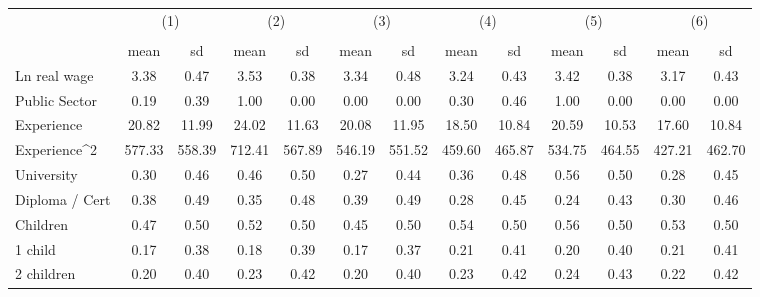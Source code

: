 {
\def\sym#1{\ifmmode^{#1}\else\(^{#1}\)\fi}
\begin{tabular}{l*{6}{cc}}
\hline\hline
                    &\multicolumn{2}{c}{(1)}  &\multicolumn{2}{c}{(2)}  &\multicolumn{2}{c}{(3)}  &\multicolumn{2}{c}{(4)}  &\multicolumn{2}{c}{(5)}  &\multicolumn{2}{c}{(6)}  \\
                    &\multicolumn{2}{c}{}     &\multicolumn{2}{c}{}     &\multicolumn{2}{c}{}     &\multicolumn{2}{c}{}     &\multicolumn{2}{c}{}     &\multicolumn{2}{c}{}     \\
                    &        mean&          sd&        mean&          sd&        mean&          sd&        mean&          sd&        mean&          sd&        mean&          sd\\
\hline
Ln real wage        &        3.38&        0.47&        3.53&        0.38&        3.34&        0.48&        3.24&        0.43&        3.42&        0.38&        3.17&        0.43\\
Public Sector       &        0.19&        0.39&        1.00&        0.00&        0.00&        0.00&        0.30&        0.46&        1.00&        0.00&        0.00&        0.00\\
Experience          &       20.82&       11.99&       24.02&       11.63&       20.08&       11.95&       18.50&       10.84&       20.59&       10.53&       17.60&       10.84\\
Experience^{2}      &      577.33&      558.39&      712.41&      567.89&      546.19&      551.52&      459.60&      465.87&      534.75&      464.55&      427.21&      462.70\\
University          &        0.30&        0.46&        0.46&        0.50&        0.27&        0.44&        0.36&        0.48&        0.56&        0.50&        0.28&        0.45\\
Diploma / Cert      &        0.38&        0.49&        0.35&        0.48&        0.39&        0.49&        0.28&        0.45&        0.24&        0.43&        0.30&        0.46\\
Children            &        0.47&        0.50&        0.52&        0.50&        0.45&        0.50&        0.54&        0.50&        0.56&        0.50&        0.53&        0.50\\
1 child             &        0.17&        0.38&        0.18&        0.39&        0.17&        0.37&        0.21&        0.41&        0.20&        0.40&        0.21&        0.41\\
2 children          &        0.20&        0.40&        0.23&        0.42&        0.20&        0.40&        0.23&        0.42&        0.24&        0.43&        0.22&        0.42\\

\end{tabular}}
